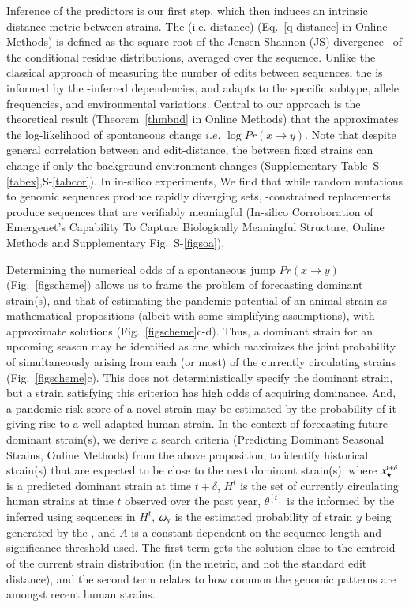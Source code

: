 \documentclass[onecolumn, compsoc,12pt]{IEEEtran}
\def\SUPPLEMENTARY{Supplementary\xspace}
\def\METHODS{Online Methods\xspace}
\begin{document}
Inference of the \enet predictors is our first step, which then induces  an intrinsic distance metric between strains. The \qdist (i.e. \enet distance) (Eq.~\eqref{q-distance} in \METHODS) is defined as the square-root of the Jensen-Shannon (JS) divergence~\cite{cover} of the conditional residue distributions, averaged over the sequence. Unlike the classical approach of measuring the number of edits between sequences, the \qdist is informed by the \enet-inferred  dependencies, and adapts to the specific subtype, allele frequencies, and environmental variations. Central to our approach is the theoretical result (Theorem~\ref{thmbnd} in \METHODS) that the \qdist  approximates the log-likelihood of spontaneous change $i.e.$ $\log Pr(x \rightarrow y )$. Note that despite general correlation between \qdist and edit-distance, the \qdist between fixed strains can change if only the background environment changes (\SUPPLEMENTARY Table~S-\ref{tabex},S-\ref{tabcor}).  In in-silico experiments, We find that while random mutations to genomic sequences produce rapidly diverging sets, \enet-constrained replacements produce sequences that are verifiably meaningful (In-silico Corroboration of Emergenet’s Capability To Capture Biologically Meaningful Structure, \METHODS and \SUPPLEMENTARY Fig.~S-\ref{figsoa}).

Determining the numerical odds of a spontaneous jump $ Pr(x \rightarrow y)$ (Fig.~\ref{figscheme}) allows us to frame the problem of forecasting  dominant strain(s), and that of estimating the  pandemic potential of an animal strain as  mathematical propositions (albeit with some simplifying assumptions), with  approximate solutions (Fig.~\ref{figscheme}c-d). Thus,  a dominant strain for an upcoming  season may be identified as one which maximizes the joint probability of simultaneously arising from each (or most)  of the currently circulating strains (Fig.~\ref{figscheme}c).  This does not deterministically specify the dominant strain, but a strain satisfying this criterion  has  high odds of acquiring dominance. And, a pandemic risk score of a novel strain may be estimated by the probability of it giving rise to a well-adapted human strain. In the context of  forecasting  future dominant strain(s),  we derive a search criteria (Predicting Dominant Seasonal Strains, \METHODS) from the above proposition, to identify  historical strain(s) that are  expected to be close to the next dominant strain(s):
%
%
where $x_\star^{t+\delta}$ is a predicted dominant strain  at time $t+\delta$, $H^t$ is the set of currently circulating human strains at time $t$  observed over the past year, $\theta^{[t]}$ is the \qdist informed by the inferred \enet using sequences in $H^t$, $\omega_{y}$ is the estimated probability of strain $y$ being generated by the \enet, and $A$ is a constant dependent on the sequence length and significance threshold used. The first term gets the solution close to the centroid of the current strain distribution (in the \qdist metric, and not the standard edit distance), and the second term relates to how common the genomic patterns are amongst recent human strains. 
\end{document}

